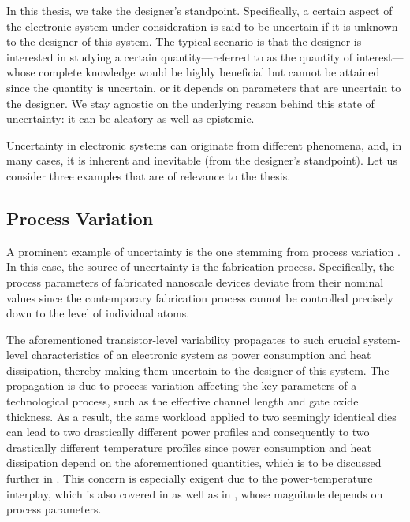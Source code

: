 In this thesis, we take the designer's standpoint. Specifically, a certain
aspect of the electronic system under consideration is said to be uncertain if
it is unknown to the designer of this system. The typical scenario is that the
designer is interested in studying a certain quantity---referred to as the
quantity of interest---whose complete knowledge would be highly beneficial but
cannot be attained since the quantity \perse is uncertain, or it depends on
parameters that are uncertain to the designer. We stay agnostic on the
underlying reason behind this state of uncertainty: it can be aleatory as well
as epistemic.

Uncertainty in electronic systems can originate from different phenomena, and,
in many cases, it is inherent and inevitable (from the designer's standpoint).
Let us consider three examples that are of relevance to the thesis.

\subsection{Process Variation}

A prominent example of uncertainty is the one stemming from process variation
\cite{chandrakasan2000, srivastava2010}. In this case, the source of uncertainty
is the fabrication process. Specifically, the process parameters of fabricated
nanoscale devices deviate from their nominal values since the contemporary
fabrication process cannot be controlled precisely down to the level of
individual atoms.

The aforementioned transistor-level variability propagates to such crucial
system-level characteristics of an electronic system as power consumption and
heat dissipation, thereby making them uncertain to the designer of this system.
The propagation is due to process variation affecting the key parameters of a
technological process, such as the effective channel length and gate oxide
thickness. As a result, the same workload applied to two seemingly identical
dies can lead to two drastically different power profiles and consequently to
two drastically different temperature profiles since power consumption and heat
dissipation depend on the aforementioned quantities, which is to be discussed
further in . This concern is especially exigent due to the
power-temperature interplay, which is also covered in  as well
as in , whose magnitude depends on process parameters.

